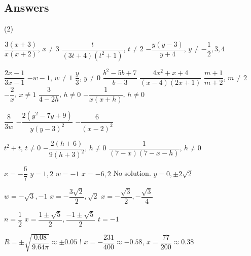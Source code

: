 \clearpage

\subsection{Answers}

\begin{tasks}(2)

\task $\dfrac{3(x+3)}{x(x+2)}$, $x \neq 3$
\task $\dfrac{t}{(3t+4)(t^2+1)}$, $t \neq 2$
\task $-\dfrac{y(y-3)}{y+4}$, $y \neq -\dfrac{1}{2}, 3, 4$ 

\task  $\dfrac{2x-1}{3x-1}$
\task  $-w-1$, $w \neq 1$
\task  $\dfrac{y}{3}$, $y \neq 0$
\task  $\dfrac{b^2-5b+7}{b-3}$
\task  $\dfrac{4x^2+x+4}{(x-4)(2x+1)}$
\task  $\dfrac{m+1}{m+2}$, $m \neq 2$
\task $-\dfrac{2}{x}$, $x \neq 1$
\task $\dfrac{3}{4-2h}$, $h \neq 0$
\task $-\dfrac{1}{x(x+h)}$, $h \neq 0$

\task  $\dfrac{8}{3w}$
\task  $-\dfrac{2(y^2-7y+9)}{y(y-3)^2}$
\task  $-\dfrac{6}{(x-2)^2}$

\task $t^2+t$, $t \neq 0$  
\task $-\dfrac{2(h+6)}{9(h+3)^2}$, $h \neq 0$ 
\task $\dfrac{1}{(7-x)(7-x-h)}$, $h \neq 0$ 


\task $x = -\dfrac{6}{7}$
\task $y = 1, 2$ 
\task $w = -1$ 
\task $x=-6, 2$
\task No solution.
\task $y = 0, \pm 2\sqrt{2}$  


\task $w = -\sqrt{3}, -1$
\task $x = -\dfrac{3\sqrt{2}}{2}, \sqrt{2}$
\task $x = -\dfrac{\sqrt{3}}{2}, -\dfrac{\sqrt{3}}{4}$

\task $n = \dfrac{1}{2}$
\task $x = \dfrac{1 \pm \sqrt{5}}{2}, \dfrac{-1 \pm \sqrt{5}}{2}$
\task $t = -1$


\task $R = \pm \sqrt{\dfrac{0.08}{9.64 \pi}} \approx \pm 0.05$ 
\task! $x = -\dfrac{231}{400} \approx -0.58$, $x = \dfrac{77}{200} \approx 0.38$ 


\end{tasks}
